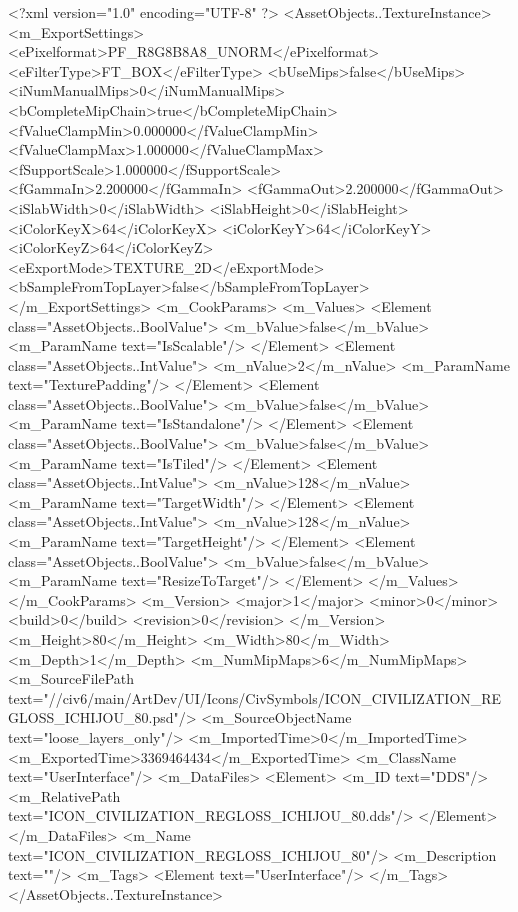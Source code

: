<?xml version="1.0" encoding="UTF-8" ?>
<AssetObjects..TextureInstance>
	<m_ExportSettings>
		<ePixelformat>PF_R8G8B8A8_UNORM</ePixelformat>
		<eFilterType>FT_BOX</eFilterType>
		<bUseMips>false</bUseMips>
		<iNumManualMips>0</iNumManualMips>
		<bCompleteMipChain>true</bCompleteMipChain>
		<fValueClampMin>0.000000</fValueClampMin>
		<fValueClampMax>1.000000</fValueClampMax>
		<fSupportScale>1.000000</fSupportScale>
		<fGammaIn>2.200000</fGammaIn>
		<fGammaOut>2.200000</fGammaOut>
		<iSlabWidth>0</iSlabWidth>
		<iSlabHeight>0</iSlabHeight>
		<iColorKeyX>64</iColorKeyX>
		<iColorKeyY>64</iColorKeyY>
		<iColorKeyZ>64</iColorKeyZ>
		<eExportMode>TEXTURE_2D</eExportMode>
		<bSampleFromTopLayer>false</bSampleFromTopLayer>
	</m_ExportSettings>
	<m_CookParams>
		<m_Values>
			<Element class="AssetObjects..BoolValue">
				<m_bValue>false</m_bValue>
				<m_ParamName text="IsScalable"/>
			</Element>
			<Element class="AssetObjects..IntValue">
				<m_nValue>2</m_nValue>
				<m_ParamName text="TexturePadding"/>
			</Element>
			<Element class="AssetObjects..BoolValue">
				<m_bValue>false</m_bValue>
				<m_ParamName text="IsStandalone"/>
			</Element>
			<Element class="AssetObjects..BoolValue">
				<m_bValue>false</m_bValue>
				<m_ParamName text="IsTiled"/>
			</Element>
			<Element class="AssetObjects..IntValue">
				<m_nValue>128</m_nValue>
				<m_ParamName text="TargetWidth"/>
			</Element>
			<Element class="AssetObjects..IntValue">
				<m_nValue>128</m_nValue>
				<m_ParamName text="TargetHeight"/>
			</Element>
			<Element class="AssetObjects..BoolValue">
				<m_bValue>false</m_bValue>
				<m_ParamName text="ResizeToTarget"/>
			</Element>
		</m_Values>
	</m_CookParams>
	<m_Version>
		<major>1</major>
		<minor>0</minor>
		<build>0</build>
		<revision>0</revision>
	</m_Version>
	<m_Height>80</m_Height>
	<m_Width>80</m_Width>
	<m_Depth>1</m_Depth>
	<m_NumMipMaps>6</m_NumMipMaps>
	<m_SourceFilePath text="//civ6/main/ArtDev/UI/Icons/CivSymbols/ICON_CIVILIZATION_REGLOSS_ICHIJOU_80.psd"/>
	<m_SourceObjectName text="loose_layers_only"/>
	<m_ImportedTime>0</m_ImportedTime>
	<m_ExportedTime>3369464434</m_ExportedTime>
	<m_ClassName text="UserInterface"/>
	<m_DataFiles>
		<Element>
			<m_ID text="DDS"/>
			<m_RelativePath text="ICON_CIVILIZATION_REGLOSS_ICHIJOU_80.dds"/>
		</Element>
	</m_DataFiles>
	<m_Name text="ICON_CIVILIZATION_REGLOSS_ICHIJOU_80"/>
	<m_Description text=""/>
	<m_Tags>
		<Element text="UserInterface"/>
	</m_Tags>
</AssetObjects..TextureInstance>

